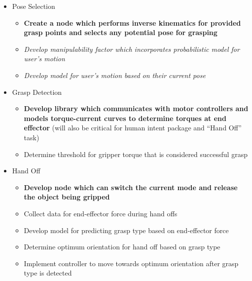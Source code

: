 \documentclass[10pt]{article}
\begin{document}
\begin{itemize}
\item Pose Selection
  \begin{itemize}
  \item \textbf{Create a node which performs inverse kinematics for provided grasp points and selects any potential pose for grasping}
  \item \textit{Develop manipulability factor which incorporates probabilistic model for user's motion}
  \item \textit{Develop model for user's motion based on their current pose}
  \end{itemize}
\item Grasp Detection
  \begin{itemize}
  \item \textbf{Develop library which communicates with motor controllers and models torque-current curves to determine torques at end effector} (will also be critical for human intent package and ``Hand Off'' task)
  \item Determine threshold for gripper torque that is considered successful grasp
  \end{itemize}
\item Hand Off
  \begin{itemize}
  \item \textbf{Develop node which can switch the current mode and release the object being gripped}
  \item Collect data for end-effector force during hand offs
  \item Develop model for predicting grasp type based on end-effector force
  \item Determine optimum orientation for hand off based on grasp type
  \item Implement controller to move towards optimum orientation after grasp type is detected
  \end{itemize}
\end{itemize}



\end{document}
